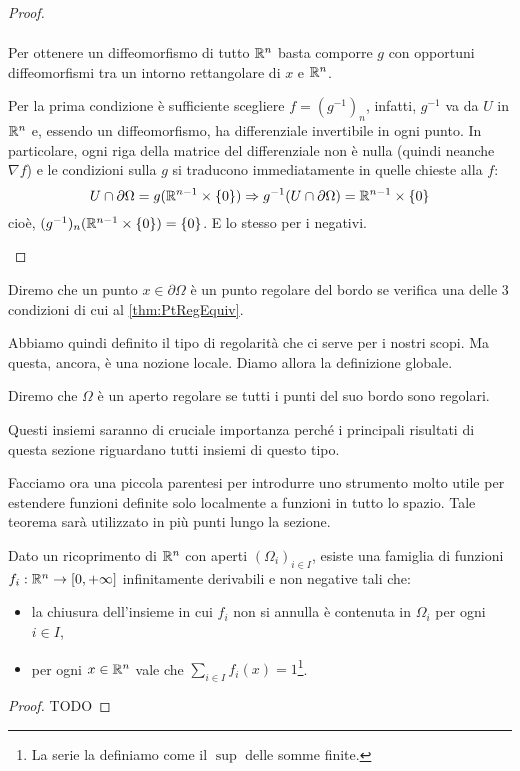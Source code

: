 \begin{proof}
\begin{description}
\begin{align*}
			\end{align*}
			Per ottenere un diffeomorfismo di tutto $\mathbb R^n$ basta comporre $g$ con opportuni diffeomorfismi tra un intorno rettangolare
			di $x$ e $\mathbb R^n$.
		\item [\ImplicationProof{PRE:ii}{PRE:i}] Per la prima condizione è sufficiente scegliere $f=(g^{-1})_n$, infatti, $g^{-1}$ va da $U$ in $\mathbb R^n$ e, essendo un diffeomorfismo, ha differenziale invertibile in ogni punto.
			In particolare, ogni riga della matrice del differenziale non è nulla (quindi neanche $\nabla f$) e le condizioni sulla $g$ si traducono immediatamente in quelle chieste alla $f$:
			\[
				U\cap \partial \Omega = g(\mathbb R^{n-1}\times\{0\}) \Rightarrow g^{-1}(U\cap \partial \Omega) = \mathbb R^{n-1}\times\{0\}
			\]
			cioè, $(g^{-1})_n(\mathbb R^{n-1}\times\{0\}) = \{0\}$. E lo stesso per i negativi.
	\end{description}
\end{proof}


\begin{definition}
	Diremo che un punto $x\in \partial \Omega$ è un punto regolare del bordo se verifica una delle $3$ condizioni di cui
	al \cref{thm:PtRegEquiv}.
\end{definition}

Abbiamo quindi definito il tipo di regolarità che ci serve per i nostri scopi. Ma questa, ancora, è una nozione locale. Diamo allora la definizione globale.

\begin{definition}
	Diremo che $\Omega$ è un aperto regolare se tutti i punti del suo bordo sono regolari.
\end{definition}

Questi insiemi saranno di cruciale importanza perché i principali risultati di questa sezione riguardano tutti insiemi di questo tipo.

Facciamo ora una piccola parentesi per introdurre uno strumento molto utile per estendere funzioni definite solo localmente a funzioni in tutto lo spazio. Tale teorema sarà utilizzato in più punti lungo la sezione.

\begin{theorem}\label{thm:PartizioneUnita}
	Dato un ricoprimento di $\mathbb R^n$ con aperti $(\Omega_i)_{i\in I}$, esiste una famiglia di funzioni $f_i:\mathbb R^n\to[0,+\infty]$ infinitamente derivabili
	e non negative tali che:
	\begin{itemize}
		\item la chiusura dell'insieme in cui $f_i$ non si annulla è contenuta in $\Omega_i$ per ogni $i\in I$,
		\item per ogni $x\in\mathbb R^n$ vale che $\sum_{i\in I} f_i(x)=1$\footnote{La serie la definiamo come il $\sup$ delle somme finite.}.
	\end{itemize}
\end{theorem}
\begin{proof}
	TODO
\end{proof}

